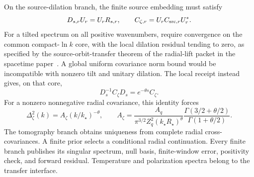 \documentclass[11pt]{article}
\theoremstyle{remark}
\begin{document}
On the source-dilation branch, the finite source embedding must satisfy
\begin{equation}
D_{s,r}U_r=U_rR_{s,r},\qquad
C_{\zeta,r}=U_rC_{{\rm src},r}U_r^*.
\end{equation}
For a tilted spectrum on all positive wavenumbers, require convergence on
the common compact-$\ln k$ core, with the local dilation residual tending to
zero, as specified by the source-orbit-transfer theorem of the radial-lift
packet in the spacetime paper~\cite{ophEinstein}. A global
uniform covariance norm bound would be incompatible with nonzero tilt and
unitary dilation. The local receipt instead gives, on that core,
\begin{equation}
D_s^{-1}C_\zeta D_s=e^{-\theta s}C_\zeta.
\end{equation}
For a nonzero nonnegative radial covariance, this identity forces
\begin{equation}
\Delta_\zeta^2(k)=A_\zeta(k/k_\star)^{-\theta},\qquad
A_\zeta=\frac{A_q}{\pi^{3/2}Z_q^2(k_\star R_\star)^\theta}
\frac{\Gamma(3/2+\theta/2)}{\Gamma(1+\theta/2)}.
\end{equation}
The tomography branch obtains uniqueness from complete radial cross-covariances.
A finite prior selects a conditional radial continuation. Every finite branch
publishes its singular spectrum, null basis, finite-window error, positivity
check, and forward residual. Temperature and polarization spectra belong to the
transfer interface.



\end{document}
